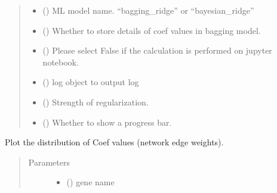 \documentclass[letterpaper,10pt,english]{sphinxmanual}
\begin{document}
\begin{fulllineitems}
\begin{fulllineitems}
\begin{quote}
\begin{description}
\begin{itemize}
\item {} 
 () \textendash{} ML model name. “bagging\_ridge” or “bayesian\_ridge”

\item {} 
 () \textendash{} Whether to store details of coef values in bagging model.

\item {} 
 () \textendash{} Please select False if the calculation is performed on jupyter notebook.

\item {} 
 () \textendash{} log object to output log

\item {} 
 () \textendash{} Strength of regularization.

\item {} 
 () \textendash{} Whether to show a progress bar.

\end{itemize}

\end{description}\end{quote}

\end{fulllineitems}


\begin{fulllineitems}
\label{\detokenize{modules/celloracle:celloracle.Net.plotCoefs}}
Plot the distribution of Coef values (network edge weights).
\begin{quote}\begin{description}
\item[{Parameters}] \leavevmode\begin{itemize}
\item {} 
 () \textendash{} gene name


\end{itemize}
\end{description}
\end{quote}
\end{fulllineitems}
\end{fulllineitems}
\end{document}
